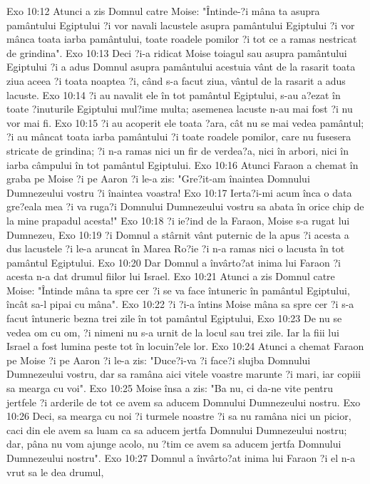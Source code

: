 Exo 10:12  Atunci a zis Domnul catre Moise: "Întinde-?i mâna ta asupra pamântului Egiptului ?i vor navali lacustele asupra pamântului Egiptului ?i vor mânca toata iarba pamântului, toate roadele pomilor ?i tot ce a ramas nestricat de grindina".
Exo 10:13  Deci ?i-a ridicat Moise toiagul sau asupra pamântului Egiptului ?i a adus Domnul asupra pamântului acestuia vânt de la rasarit toata ziua aceea ?i toata noaptea ?i, când s-a facut ziua, vântul de la rasarit a adus lacuste.
Exo 10:14  ?i au navalit ele în tot pamântul Egiptului, s-au a?ezat în toate ?inuturile Egiptului mul?ime multa; asemenea lacuste n-au mai fost ?i nu vor mai fi.
Exo 10:15  ?i au acoperit ele toata ?ara, cât nu se mai vedea pamântul; ?i au mâncat toata iarba pamântului ?i toate roadele pomilor, care nu fusesera stricate de grindina; ?i n-a ramas nici un fir de verdea?a, nici în arbori, nici în iarba câmpului în tot pamântul Egiptului.
Exo 10:16  Atunci Faraon a chemat în graba pe Moise ?i pe Aaron ?i le-a zis: "Gre?it-am înaintea Domnului Dumnezeului vostru ?i înaintea voastra!
Exo 10:17  Ierta?i-mi acum înca o data gre?eala mea ?i va ruga?i Domnului Dumnezeului vostru sa abata în orice chip de la mine prapadul acesta!"
Exo 10:18  ?i ie?ind de la Faraon, Moise s-a rugat lui Dumnezeu,
Exo 10:19  ?i Domnul a stârnit vânt puternic de la apus ?i acesta a dus lacustele ?i le-a aruncat în Marea Ro?ie ?i n-a ramas nici o lacusta în tot pamântul Egiptului.
Exo 10:20  Dar Domnul a învârto?at inima lui Faraon ?i acesta n-a dat drumul fiilor lui Israel.
Exo 10:21  Atunci a zis Domnul catre Moise: "Întinde mâna ta spre cer ?i se va face întuneric în pamântul Egiptului, încât sa-l pipai cu mâna".
Exo 10:22  ?i ?i-a întins Moise mâna sa spre cer ?i s-a facut întuneric bezna trei zile în tot pamântul Egiptului,
Exo 10:23  De nu se vedea om cu om, ?i nimeni nu s-a urnit de la locul sau trei zile. Iar la fiii lui Israel a fost lumina peste tot în locuin?ele lor.
Exo 10:24  Atunci a chemat Faraon pe Moise ?i pe Aaron ?i le-a zis: "Duce?i-va ?i face?i slujba Domnului Dumnezeului vostru, dar sa ramâna aici vitele voastre marunte ?i mari, iar copiii sa mearga cu voi".
Exo 10:25  Moise însa a zis: "Ba nu, ci da-ne vite pentru jertfele ?i arderile de tot ce avem sa aducem Domnului Dumnezeului nostru.
Exo 10:26  Deci, sa mearga cu noi ?i turmele noastre ?i sa nu ramâna nici un picior, caci din ele avem sa luam ca sa aducem jertfa Domnului Dumnezeului nostru; dar, pâna nu vom ajunge acolo, nu ?tim ce avem sa aducem jertfa Domnului Dumnezeului nostru".
Exo 10:27  Domnul a învârto?at inima lui Faraon ?i el n-a vrut sa le dea drumul,
